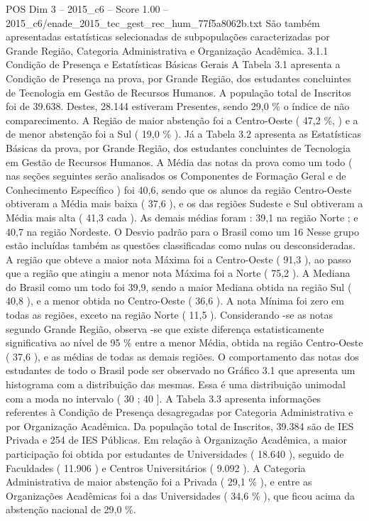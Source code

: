 \begin{textsample}{POS Dim 3 – 2015\_c6 – Score 1.00 – 2015\_c6/enade\_2015\_tec\_gest\_rec\_hum\_77f5a8062b.txt}
São também apresentadas estatísticas selecionadas de subpopulações caracterizadas por Grande Região, Categoria Administrativa e Organização Acadêmica. 3.1.1 Condição de Presença e Estatísticas Básicas Gerais A Tabela 3.1 apresenta a Condição de Presença na prova, por Grande Região, dos estudantes concluintes de Tecnologia em Gestão de Recursos Humanos.
A população total de Inscritos foi de 39.638.
Destes, 28.144 estiveram Presentes, sendo 29,0 \% o índice de não comparecimento.
A Região de maior abstenção foi a Centro-Oeste ( 47,2 \%, ) e a de menor abstenção foi a Sul ( 19,0 \% ).
Já a Tabela 3.2 apresenta as Estatísticas Básicas da prova, por Grande Região, dos estudantes concluintes de Tecnologia em Gestão de Recursos Humanos.
A Média das notas da prova como um todo ( nas seções seguintes serão analisados os Componentes de Formação Geral e de Conhecimento Específico ) foi 40,6, sendo que os alunos da região Centro-Oeste obtiveram a Média mais baixa ( 37,6 ), e os das regiões Sudeste e Sul obtiveram a Média mais alta ( 41,3 cada ).
As demais médias foram : 39,1 na região Norte ; e 40,7 na região Nordeste.
O Desvio padrão para o Brasil como um 16 Nesse grupo estão incluídas também as questões classificadas como nulas ou desconsideradas.
A região que obteve a maior nota Máxima foi a Centro-Oeste ( 91,3 ), ao passo que a região que atingiu a menor nota Máxima foi a Norte ( 75,2 ).
A Mediana do Brasil como um todo foi 39,9, sendo a maior Mediana obtida na região Sul ( 40,8 ), e a menor obtida no Centro-Oeste ( 36,6 ).
A nota Mínima foi zero em todas as regiões, exceto na região Norte ( 11,5 ).
Considerando -se as notas segundo Grande Região, observa -se que existe diferença estatisticamente significativa ao nível de 95 \% entre a menor Média, obtida na região Centro-Oeste ( 37,6 ), e as médias de todas as demais regiões.
O comportamento das notas dos estudantes de todo o Brasil pode ser observado no Gráfico 3.1 que apresenta um histograma com a distribuição das mesmas.
Essa é uma distribuição unimodal com a moda no intervalo ( 30 ; 40 ].
A Tabela 3.3 apresenta informações referentes à Condição de Presença desagregadas por Categoria Administrativa e por Organização Acadêmica.
Da população total de Inscritos, 39.384 são de IES Privada e 254 de IES Públicas.
Em relação à Organização Acadêmica, a maior participação foi obtida por estudantes de Universidades ( 18.640 ), seguido de Faculdades ( 11.906 ) e Centros Universitários ( 9.092 ).
A Categoria Administrativa de maior abstenção foi a Privada ( 29,1 \% ), e entre as Organizações Acadêmicas foi a das Universidades ( 34,6 \% ), que ficou acima da abstenção nacional de 29,0 \%.

\end{textsample}
